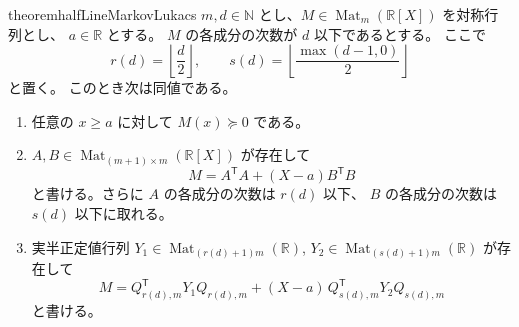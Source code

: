 \documentclass[uplatex,dvipdfmx]{jsarticle}
\newcommand{\Poly}{\mathbb{R}[X]}
\newcommand{\Mat}{\operatorname{Mat}}
\newcommand{\psd}{\succeq 0}
\theoremstyle{matrixsosdefinition}
\begin{document}
\begin{restatable}{theorem}{halfLineMarkovLukacs}
  \(m,d\in\mathbb{N}\) とし、\(M\in\Mat_m(\Poly)\) を対称行列とし、
  \(a\in\mathbb{R}\) とする。
  \(M\) の各成分の次数が \(d\) 以下であるとする。
  ここで
  \[
    r(d)=\left\lfloor\frac{d}{2}\right\rfloor,\qquad
    s(d)=\left\lfloor\frac{\max(d-1,0)}{2}\right\rfloor
  \]
  と置く。
  このとき次は同値である。
  \begin{enumerate}[label=(\arabic*)]
    \item 任意の \(x\ge a\) に対して \(M(x)\psd\) である。
    \item \(A,B\in\Mat_{(m+1)\times m}(\Poly)\) が存在して
      \[
        M=A^{\mathsf T}A+(X-a)B^{\mathsf T}B
      \]
      と書ける。さらに \(A\) の各成分の次数は \(r(d)\) 以下、
      \(B\) の各成分の次数は \(s(d)\) 以下に取れる。
    \item 実半正定値行列
      \(Y_1\in\Mat_{(r(d)+1)m}(\mathbb{R})\),
      \(Y_2\in\Mat_{(s(d)+1)m}(\mathbb{R})\) が存在して
      \[
        M=
        Q_{r(d),m}^{\mathsf T}Y_1Q_{r(d),m}
        +
        (X-a)\,Q_{s(d),m}^{\mathsf T}Y_2Q_{s(d),m}
      \]
      と書ける。
  \end{enumerate}
\end{restatable}
\end{document}
